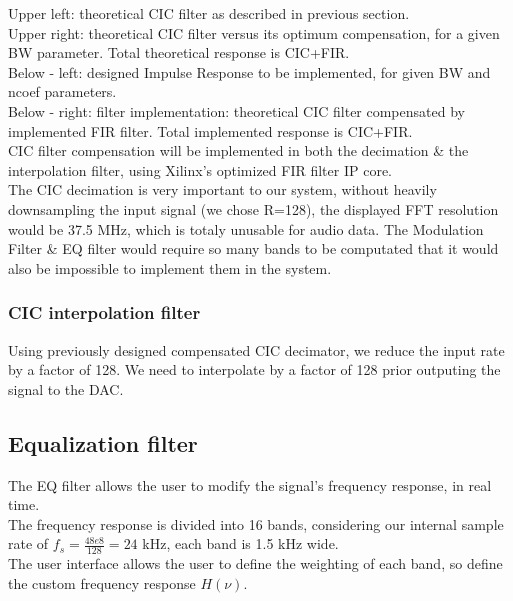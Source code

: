 \documentclass{article}
\begin{document}
Upper left: theoretical CIC filter as described in previous
section. \\

Upper right: theoretical CIC filter versus its optimum
compensation, for a given BW parameter.
Total theoretical response is CIC+FIR. \\

Below - left: designed Impulse Response to be implemented,
for given BW and ncoef parameters. \\

Below - right: filter implementation: theoretical
CIC filter compensated by implemented FIR filter.
Total implemented response is CIC+FIR. \\

CIC filter compensation 
will be implemented in both the decimation
\& the interpolation filter, using
Xilinx's optimized FIR filter IP core. \\

The CIC decimation is very important
to our system, without heavily downsampling
the input signal (we chose R=128),
the displayed FFT resolution would be
37.5 MHz, which is totaly unusable for audio data.
The Modulation Filter \& EQ filter would require so 
many bands to be computated that it would also be impossible
to implement them in the system.

\subsubsection{CIC interpolation filter}

Using previously designed compensated CIC decimator,
we reduce the input rate by a factor of 128.
We need to interpolate by a factor of 128 prior
outputing the signal to the DAC.


\newpage
\subsection{Equalization filter}

The EQ filter allows the user 
to modify the signal's frequency response,
in real time. \\

The frequency response is divided into 16 bands,
considering our internal sample rate of 
$f_s = \frac{48e8}{128} = 24$ kHz,
each band is 1.5 kHz wide. \\

The user interface allows the user
to define the weighting of each band,
so define the custom frequency response
$H(\nu)$. \\
\end{document}
